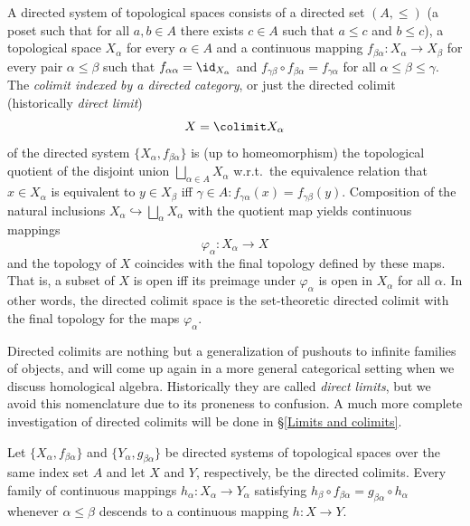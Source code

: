 \begin{defn}\label{def directed system}
    A directed system of topological spaces consists of a directed set $(A,\leq)$ (a poset such that for all $a,b\in A$ there exists $c\in A$ such that $a\leq c$ and $b\leq c$), a topological space $X_\alpha$ for every $\alpha \in A$ and a continuous mapping $f_{\beta\alpha}:X_\alpha\to X_\beta$ for every pair $\alpha\leq\beta$ such that $f_{\alpha\alpha}=\id_{X_\alpha}$ and $f_{\gamma\beta}\circ f_{\beta\alpha}=f_{\gamma\alpha}$ for all $\alpha\leq\beta\leq \gamma$. The \emph{colimit indexed by a directed category}, or just the directed colimit (historically \emph{direct limit})
    \[X=\colimit X_\alpha\]
    of the directed system $\{X_\alpha,f_{\beta\alpha}\}$ is (up to homeomorphism) the topological quotient of the disjoint union $\bigsqcup_{\alpha\in A} X_\alpha$ w.r.t.\ the equivalence relation that $x\in X_\alpha$ is equivalent to $y\in X_\beta$ iff $\gamma\in A: f_{\gamma\alpha}(x)=f_{\gamma\beta} (y)$. Composition of the natural inclusions $X_\alpha\hookrightarrow \bigsqcup_\alpha X_\alpha$ with the quotient map yields continuous mappings
    \[\varphi_\alpha:X_\alpha\to X\]
    and the topology of $X$ coincides with the final topology defined by these maps. That is, a subset of $X$ is open iff its preimage under $\varphi_\alpha$ is open in $X_\alpha$ for all $\alpha$. In other words, the directed colimit space is the set-theoretic directed colimit with the final topology for the maps $\varphi_{\alpha}$.
\end{defn}

Directed colimits are nothing but a generalization of pushouts to infinite families of objects, and will come up again in a more general categorical setting when we discuss homological algebra. Historically they are called \emph{direct limits}, but we avoid this nomenclature due to its proneness to confusion. A much more complete investigation of directed colimits will be done in \S\ref{Limits and colimits}.


\begin{prop}[{{\cite[Prop.~3.1.14]{RS2}}}]\label{prop 3.1.14 RS2}
    Let $\{X_\alpha,f_{\beta\alpha}\}$ and $\{Y_\alpha,g_{\beta\alpha}\}$ be directed systems of topological spaces over the same index set $A$ and let $X$ and $Y$, respectively, be the directed colimits. Every family of continuous mappings $h_\alpha:X_\alpha\to Y_\alpha$ satisfying $h_\beta \circ f_{\beta\alpha}=g_{\beta\alpha}\circ h_\alpha$ whenever $\alpha\leq \beta$ descends to a continuous mapping $h:X\to Y$.
\end{prop}


